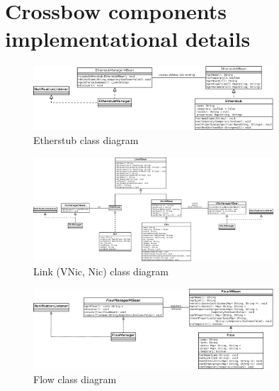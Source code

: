 \documentclass[11pt]{book}
\begin{document}
    \section{Crossbow components implementational details}


        \begin{figure}[H]
          \begin{center}
            \includegraphics[width=0.8\textwidth]{img/impl/etherstub.png}
          \end{center}
          \caption{Etherstub class diagram}
        \end{figure}        

        \begin{figure}[H]
          \begin{center}
            \includegraphics[width=0.8\textwidth]{img/impl/link.png}
          \end{center}
          \caption{Link (VNic, Nic) class diagram}
        \end{figure}        

        \begin{figure}[H]
          \begin{center}
            \includegraphics[width=0.8\textwidth]{img/impl/flow.png}
          \end{center}
          \caption{Flow class diagram}
        \end{figure}        
\end{document}

